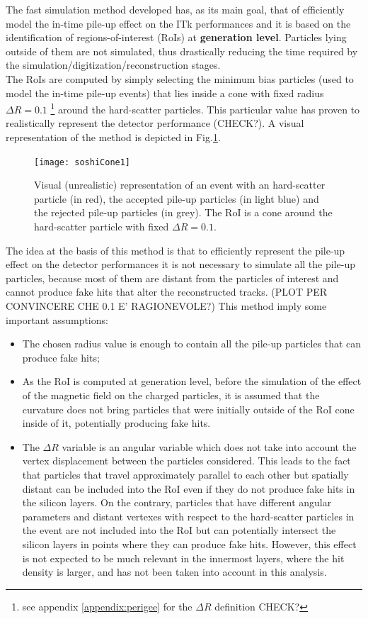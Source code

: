 \documentclass[a4paper,twoside,12pt]{article}
\begin{document}
The fast simulation method developed has, as its main goal, that of efficiently model the
in-time pile-up effect on the ITk performances and it is based on the identification of 
regions-of-interest (RoIs) at \textbf{generation level}. Particles lying outside of them are not 
simulated, thus drastically reducing the time required by the simulation/digitization/reconstruction stages. \\

The RoIs are computed by simply selecting the minimum bias particles (used to model the in-time
pile-up events) that lies inside a cone with fixed radius $\Delta R = 0.1$ \footnote{see appendix \ref{appendix:perigee} for the $\Delta R$ definition CHECK?}
around the hard-scatter particles. This particular value has proven to realistically represent the detector performance (CHECK?). A visual
representation of the method is depicted in Fig.\ref{fig:soshiCone1}.\\

\begin{figure} [h]
	\centering
	\texttt{[image: soshiCone1]}
	\caption{Visual (unrealistic) representation of an event with an hard-scatter particle (in red), 
	the accepted pile-up particles (in light blue) and the rejected pile-up particles (in grey).
	The RoI is a cone around the hard-scatter particle with fixed $\Delta R = 0.1$.}
	\label{fig:soshiCone1}
\end{figure}


The idea at the basis of this method is that to efficiently represent the pile-up effect on the
detector performances it is not necessary to simulate all the pile-up particles, because most 
of them are distant from the particles of interest and cannot produce fake hits that 
alter the reconstructed tracks. (PLOT PER CONVINCERE CHE 0.1 E' RAGIONEVOLE?) This 
method imply some important assumptions:
\begin{itemize}
\item The chosen radius value is enough to contain all the pile-up particles that can produce
fake hits;
\item As the RoI is computed at generation level, before the simulation of the effect of the
magnetic field on the charged particles, it is assumed that the curvature does not bring
particles that were initially outside of the RoI cone inside of it, potentially producing fake hits.
\item The $\Delta R$ variable is an angular variable which does not take into account the vertex displacement between the particles considered. This leads to the fact that particles 
that travel approximately parallel to each other but spatially distant can be included into the
RoI even if they do not produce fake hits in the silicon layers. On the contrary, particles that 
have different angular parameters and distant vertexes with respect to the hard-scatter
particles in the event are not included into the RoI but can potentially intersect the silicon 
layers in points where they can produce fake hits. However, this effect is not expected
to be much relevant in the innermost layers, where the hit density is larger, and has not been
taken into account in this analysis. 
\end{itemize}
\end{document}
